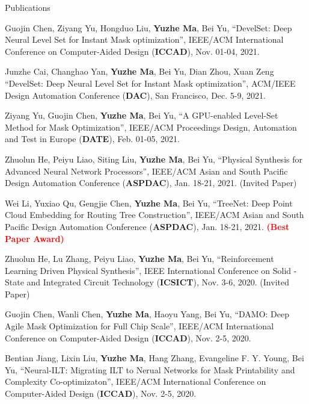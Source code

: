 \begin{rSection}{Publications}
\begin{etaremune}
\item {
    Guojin Chen, Ziyang Yu, Hongduo Liu, \textbf{Yuzhe Ma}, Bei Yu,
    ``DevelSet: Deep Neural Level Set for Instant Mask optimization'',
    IEEE/ACM International Conference on Computer-Aided Design (\textbf{ICCAD}), Nov. 01-04, 2021.
}

\item {
    Junzhe Cai, Changhao Yan, \textbf{Yuzhe Ma}, Bei Yu, Dian Zhou, Xuan Zeng
    ``DevelSet: Deep Neural Level Set for Instant Mask optimization'',
    ACM/IEEE Design Automation Conference (\textbf{DAC}), San Francisco, Dec. 5-9, 2021. 
}

\item {
        Ziyang Yu, Guojin Chen, \textbf{Yuzhe Ma}, Bei Yu,
        ``A GPU-enabled Level-Set Method for Mask Optimization'',
        IEEE/ACM Proceedings Design, Automation and Test in Europe (\textbf{DATE}), Feb. 01-05, 2021.
    }

\item {
        Zhuolun He, Peiyu Liao, Siting Liu, \textbf{Yuzhe Ma}, Bei Yu,
        ``Physical Synthesis for Advanced Neural Network Processors'',
         IEEE/ACM Asian and South Pacific Design Automation Conference (\textbf{ASPDAC}), Jan. 18-21, 2021. (Invited Paper)
    }

\item {
        Wei Li, Yuxiao Qu, Gengjie Chen, \textbf{Yuzhe Ma}, Bei Yu,
        ``TreeNet: Deep Point Cloud Embedding for Routing Tree Construction'',
         IEEE/ACM Asian and South Pacific Design Automation Conference (\textbf{ASPDAC}), Jan. 18-21, 2021.
        \textcolor{red}{\textbf{(Best Paper Award)}}
    }

\item{
        Zhuolun He, Lu Zhang, Peiyu Liao, \textbf{Yuzhe Ma}, Bei Yu,
        ``Reinforcement Learning Driven Physical Synthesis'',
        IEEE International Conference on Solid -State and Integrated Circuit Technology (\textbf{ICSICT}), Nov. 3-6, 2020. (Invited Paper)
    }

\item{
        Guojin Chen, Wanli Chen, \textbf{Yuzhe Ma}, Haoyu Yang, Bei Yu,
        ``DAMO: Deep Agile Mask Optimization for Full Chip Scale'',
        IEEE/ACM International Conference on Computer-Aided Design (\textbf{ICCAD}), Nov. 2-5, 2020.
    }

\item{
        Bentian Jiang, Lixin Liu, \textbf{Yuzhe Ma}, Hang Zhang, Evangeline F. Y. Young, Bei Yu,
        ``Neural-ILT: Migrating ILT to Nerual Networks for Mask Printability and Complexity Co-optimizaton'',
        IEEE/ACM International Conference on Computer-Aided Design (\textbf{ICCAD}), Nov. 2-5, 2020.
    }


\end{etaremune}
\end{rSection}
